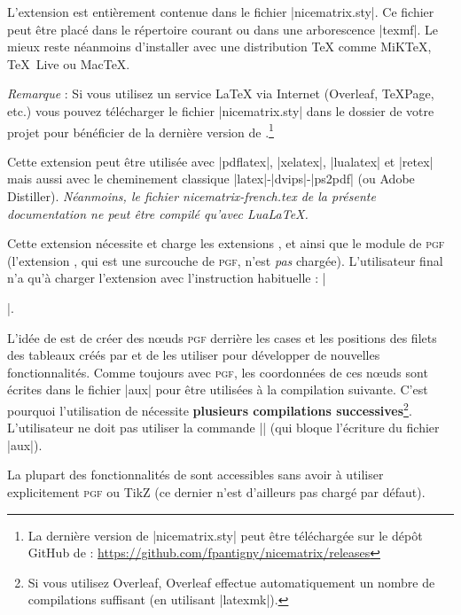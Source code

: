 \documentclass[dvipsnames]{article}
\begin{document}
\vspace{8mm}

L'extension  est entièrement contenue dans le fichier
|nicematrix.sty|. Ce fichier peut être placé dans le répertoire courant ou dans
une arborescence |texmf|. Le mieux reste néanmoins d'installer 
avec une distribution TeX comme MiKTeX, TeX~Live ou MacTeX.

\smallskip
\emph{Remarque} : Si vous utilisez un service LaTeX via Internet (Overleaf,
TeXPage, etc.) vous pouvez télécharger le fichier |nicematrix.sty| dans le
dossier de votre projet pour bénéficier de la dernière version de
.\footnote{La dernière version de |nicematrix.sty| peut être
  téléchargée sur le dépôt GitHub de  : \newline \small
  \url{https://github.com/fpantigny/nicematrix/releases}}

\smallskip
Cette extension peut être utilisée avec |pdflatex|, |xelatex|, |lualatex| et
|retex| mais aussi avec le cheminement classique |latex|-|dvips|-|ps2pdf| (ou
Adobe Distiller). \textsl{Néanmoins, le fichier nicematrix-french.tex de la
  présente documentation ne peut être compilé qu'avec LuaLaTeX.}

\smallskip
Cette extension nécessite et charge les extensions ,  et
 ainsi que le module  de \textsc{pgf} (l'extension
, qui est une surcouche de \textsc{pgf}, n'est \emph{pas} chargée).
L'utilisateur final n'a qu'à charger l'extension  avec
l'instruction habituelle : |\usepackage{nicematrix}|.


\smallskip
L'idée de  est de créer des nœuds \textsc{pgf} derrière les
cases et les positions des filets des tableaux créés par  et de les
utiliser pour développer de nouvelles fonctionnalités. Comme toujours avec
\textsc{pgf}, les coordonnées de ces nœuds sont écrites dans le fichier |aux|
pour être utilisées à la compilation suivante. C'est pourquoi l'utilisation de
 nécessite \textbf{plusieurs compilations
  successives}\footnote{Si vous utilisez Overleaf, Overleaf effectue
  automatiquement un nombre de compilations suffisant (en utilisant
  |latexmk|).}. L'utilisateur ne doit pas utiliser la commande |\nofiles| (qui
bloque l'écriture du fichier |aux|).

\smallskip
La plupart des fonctionnalités de  sont accessibles sans avoir à
utiliser explicitement \textsc{pgf} ou TikZ (ce dernier n'est d'ailleurs pas
chargé par défaut).
\end{document}
